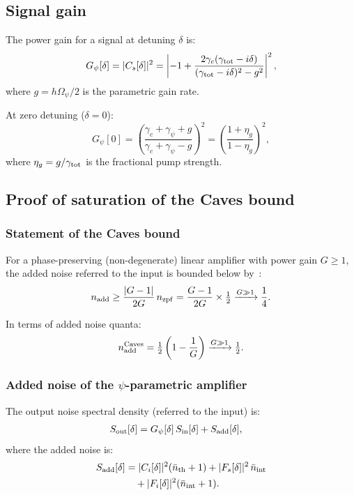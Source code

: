 \documentclass[12pt,aps,prd,twocolumn,superscriptaddress,nofootinbib]{revtex4-2}
\newcommand{\Opsi}{\Omega_\psi}
\newcommand{\gpsi}{\gamma_\psi}
\newcommand{\half}{\tfrac{1}{2}}
\begin{document}
\subsection{Signal gain}

The power gain for a signal at detuning $\delta$ is:
\begin{equation}
G_\psi[\delta] = |C_s[\delta]|^2
= \left|{-1 + \frac{2\gamma_c(\gamma_{\rm tot}-i\delta)}
{(\gamma_{\rm tot}-i\delta)^2 - g^2}}\right|^2,
\label{eq:quantum_gain}
\end{equation}
where $g = h\Opsi/2$ is the parametric gain rate.

At zero detuning ($\delta = 0$):
\begin{equation}
G_\psi[0] = \left(\frac{\gamma_c + \gpsi + g}
{\gamma_c + \gpsi - g}\right)^2
= \left(\frac{1+\eta_g}{1-\eta_g}\right)^2,
\label{eq:G0}
\end{equation}
where $\eta_g = g/\gamma_{\rm tot}$ is the fractional pump strength.

\subsection{Proof of saturation of the Caves bound}
\label{sec:caves}

\subsubsection{Statement of the Caves bound}

For a phase-preserving (non-degenerate) linear amplifier with
power gain $G \geq 1$, the added noise referred to the input is
bounded below by~\cite{Caves1982}:
\begin{equation}
n_{\rm add} \geq \frac{|G-1|}{2G}\,n_{\rm zpf}
= \frac{G-1}{2G}\times\half
\xrightarrow{G\gg1} \frac{1}{4}.
\label{eq:caves_bound}
\end{equation}

In terms of added noise quanta:
\begin{equation}
n_{\rm add}^{\rm Caves} = \half\left(1 - \frac{1}{G}\right)
\xrightarrow{G\gg1} \half.
\label{eq:caves_quanta}
\end{equation}

\subsubsection{Added noise of the $\psi$-parametric amplifier}

The output noise spectral density (referred to the input) is:
\begin{align}
S_{\rm out}[\delta] &= G_\psi[\delta]\,S_{\rm in}[\delta]
+ S_{\rm add}[\delta],
\label{eq:noise_spectrum}
\end{align}
where the added noise is:
\begin{align}
S_{\rm add}[\delta] &= |C_i[\delta]|^2(\bar{n}_{\rm th}+1)
+ |F_s[\delta]|^2\,\bar{n}_{\rm int}
\nonumber\\
&\quad + |F_i[\delta]|^2(\bar{n}_{\rm int}+1).
\label{eq:S_add}
\end{align}
\end{document}
